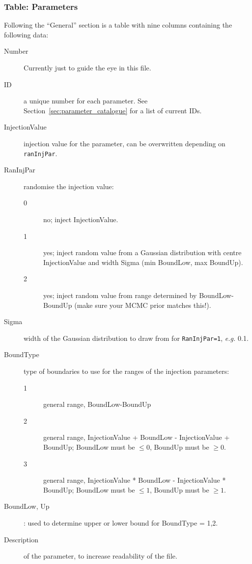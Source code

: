 \documentclass[10pt]{article}
\begin{document}
\subsubsection{Table: Parameters}


Following the ``General'' section is a table with nine columns containing the following data:

\begin{description}
\item[Number] Currently just to guide the eye in this file.
\item[ID] a unique number for each parameter.  See Section~\ref{sec:parameter_catalogue} for a list of current IDs.
\item[InjectionValue] injection value for the parameter, can be overwritten depending on \texttt{ranInjPar}.
\item[RanInjPar] randomise the injection value:
  \begin{description}
  \item[0] no; inject InjectionValue.
  \item[1] yes; inject random value from a Gaussian distribution with centre InjectionValue and width Sigma (min BoundLow, max BoundUp).
  \item[2] yes; inject random value from range determined by BoundLow-BoundUp (make sure your MCMC prior matches this!).
  \end{description}
\item[Sigma] width of the Gaussian distribution to draw from for \texttt{RanInjPar=1}, \textit{e.g.} 0.1.

  
\item[BoundType] type of boundaries to use for the ranges of the injection parameters:
  \begin{description}
  \item[1] general range, BoundLow-BoundUp
  \item[2] general range, InjectionValue + BoundLow - InjectionValue + BoundUp; BoundLow must be $\leq 0$, BoundUp must be $\geq 0$.
  \item[3] general range, InjectionValue * BoundLow - InjectionValue * BoundUp; BoundLow must be $\leq 1$, BoundUp must be $\geq 1$.
  \end{description}
\item[BoundLow, Up]: used to determine upper or lower bound for BoundType = 1,2.
\item[Description] of the parameter, to increase readability of the file.
\end{description}                
\end{document}
